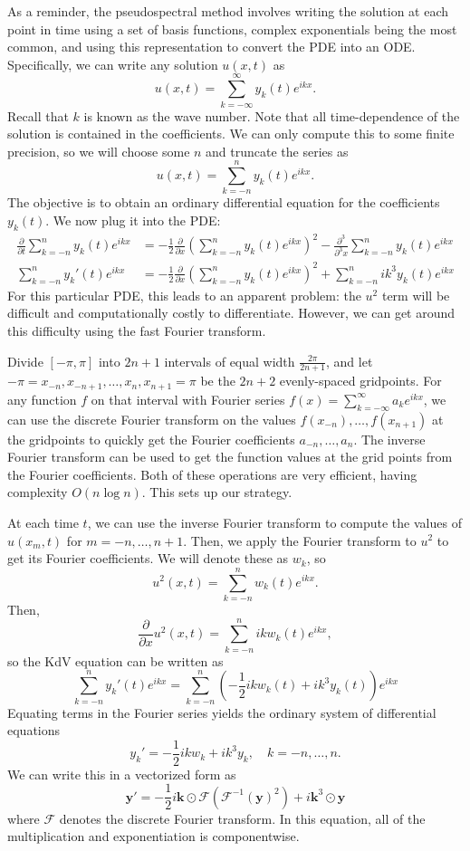 As a reminder, the pseudospectral method involves writing the solution at each point in time using a set of basis functions, complex exponentials being the most common, and using this representation to convert the PDE into an ODE.
Specifically, we can write any solution \(u(x,t)\) as
\[
u(x,t) = \sum_{k=-\infty}^\infty y_k(t)e^{ikx}.
\]
Recall that \(k\) is known as the wave number.
Note that all time-dependence of the solution is contained in the coefficients.
We can only compute this to some finite precision, so we will choose some \(n\) and truncate the series as
\[
u(x,t) = \sum_{k=-n}^n y_k(t)e^{ikx}.
\]
The objective is to obtain an ordinary differential equation for the coefficients \(y_k(t)\).
We now plug it into the PDE:
\begin{align*}
\frac{\partial}{\partial t}\sum_{k=-n}^n y_k(t)e^{ikx}
&=
-\frac{1}{2} \frac{\partial}{\partial x}\left(
\sum_{k=-n}^n y_k(t)e^{ikx}
\right)^2
-
\frac{\partial^3}{\partial^3 x}\sum_{k=-n}^n y_k(t)e^{ikx}
\\
\sum_{k=-n}^n y_k'(t)e^{ikx}
&=
-\frac{1}{2} \frac{\partial}{\partial x}\left(
\sum_{k=-n}^n y_k(t)e^{ikx}
\right)^2
+
\sum_{k=-n}^n ik^3 y_k(t)e^{ikx}
\end{align*}
For this particular PDE, this leads to an apparent problem: the \(u^2\) term will be difficult and computationally costly to differentiate.
However, we can get around this difficulty using the fast Fourier transform.

Divide \([-\pi, \pi]\) into \(2n+1\) intervals of equal width \(\frac{2\pi}{2n+1}\), and let \(-\pi=x_{-n},x_{-n+1},\ldots,x_n,x_{n+1}=\pi\) be the \(2n+2\) evenly-spaced gridpoints.
For any function \(f\) on that interval with Fourier series \(f(x)=\sum_{k=-\infty}^\infty a_k e^{ikx}\), we can use the discrete Fourier transform on the values \(f(x_{-n}),\ldots,f(x_{n+1})\) at the gridpoints to quickly get the Fourier coefficients \(a_{-n},\ldots, a_n\).
The inverse Fourier transform can be used to get the function values at the grid points from the Fourier coefficients.
Both of these operations are very efficient, having complexity \(O(n\log n)\).
This sets up our strategy.

At each time \(t\), we can use the inverse Fourier transform to compute the values of \(u(x_m,t)\) for \(m=-n,\ldots,n+1\).
Then, we apply the Fourier transform to \(u^2\) to get its Fourier coefficients.
We will denote these as \(w_k\), so
\[
u^2(x,t)=\sum_{k=-n}^n w_k(t) e^{ikx}.
\]
Then, 
\[
\frac{\partial}{\partial x}
u^2(x,t)=\sum_{k=-n}^n ik w_k(t) e^{ikx},
\]
so the KdV equation can be written as
\[
\sum_{k=-n}^n y_k'(t)e^{ikx}
=
\sum_{k=-n}^n \left(
-\frac{1}{2}ikw_k(t)
+
ik^3 y_k(t)
\right)e^{ikx}
\]
Equating terms in the Fourier series yields the ordinary system of differential equations
\[
y_k' = -\frac{1}{2}ikw_k + ik^3 y_k, \quad k=-n,\ldots, n.
\]
We can write this in a vectorized form as
\begin{equation}
\mathbf{y}' = -\frac{1}{2}i\mathbf{k}\odot\mathcal{F}(\mathcal{F}^{-1}(\mathbf{y})^2) + i\mathbf{k}^3 \odot\mathbf{y}
\label{lab:solitons:pseudospectral}
\end{equation}
where \(\mathcal{F}\) denotes the discrete Fourier transform.
In this equation, all of the multiplication and exponentiation is componentwise.

